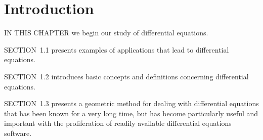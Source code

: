 \chapter{Introduction}

\noindent
IN THIS CHAPTER we begin our study of differential equations.

\medskip
\noindent
SECTION~1.1 presents examples of applications that lead to differential equations.

\medskip
\noindent
SECTION~1.2 introduces basic concepts and definitions concerning differential equations.

\medskip
\noindent
SECTION~1.3 presents a geometric method for dealing with differential equations that has been known for a very long time, but has become particularly useful and important with the proliferation of readily available differential equations software.

\newpage






